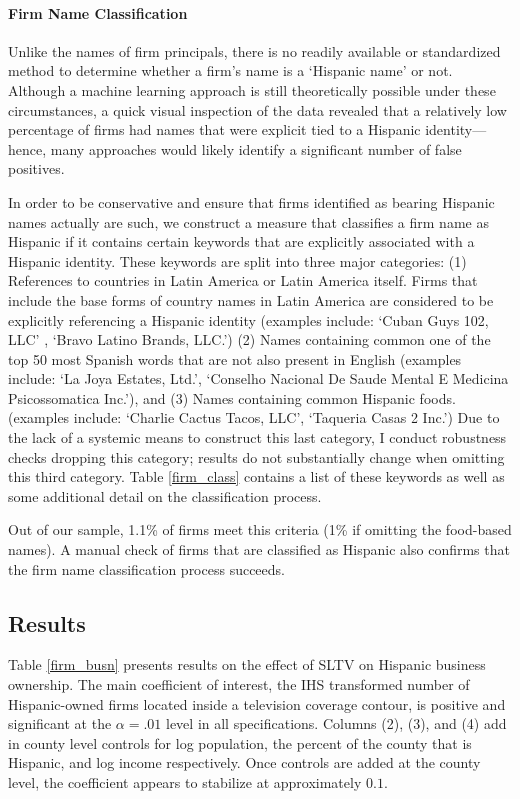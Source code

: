\documentclass[11pt]{article}
\begin{document}
\paragraph{Firm Name Classification} Unlike the names of firm principals, there is no readily available or standardized method to determine whether a firm's name is a `Hispanic name' or not. Although a machine learning approach is still theoretically possible under these circumstances, a quick visual inspection of the data revealed that a relatively low percentage of firms had names that were explicit tied to a Hispanic identity---hence, many approaches would likely identify a significant number of false positives.

In order to be conservative and ensure that firms identified as bearing Hispanic names actually are such, we construct a measure that classifies a firm name as Hispanic if it contains certain keywords that are explicitly associated with a Hispanic identity. These keywords are split into three major categories: (1) References to countries in Latin America or Latin America itself. Firms that include the base forms of country names in Latin America are considered to be explicitly referencing a Hispanic identity (examples include: `Cuban Guys 102, LLC' , `Bravo Latino Brands, LLC.') (2) Names containing common one of the top 50 most Spanish words that are not also present in English (examples include: `La Joya Estates, Ltd.', `Conselho Nacional De Saude Mental E Medicina Psicossomatica Inc.'), and (3) Names containing common Hispanic foods. (examples include: `Charlie Cactus Tacos, LLC', `Taqueria Casas 2 Inc.') Due to the lack of a systemic means to construct this last category, I conduct robustness checks dropping this category; results do not substantially change when omitting this third category. Table \ref{firm_class} contains a list of these keywords as well as some additional detail on the classification process.

Out of our sample, 1.1\% of firms meet this criteria (1\% if omitting the food-based names). A manual check of firms that are classified as Hispanic also confirms that the firm name classification process succeeds.

\subsection{Results}

Table \ref{firm_busn} presents results on the effect of SLTV on Hispanic business ownership. The main coefficient of interest, the IHS transformed number of Hispanic-owned firms located inside a television coverage contour, is positive and significant at the $\alpha = .01$ level in all specifications. Columns (2), (3), and (4) add in county level controls for log population, the percent of the county that is Hispanic, and log income respectively. Once controls are added at the county level, the coefficient appears to stabilize at approximately $0.1$.
\end{document}
